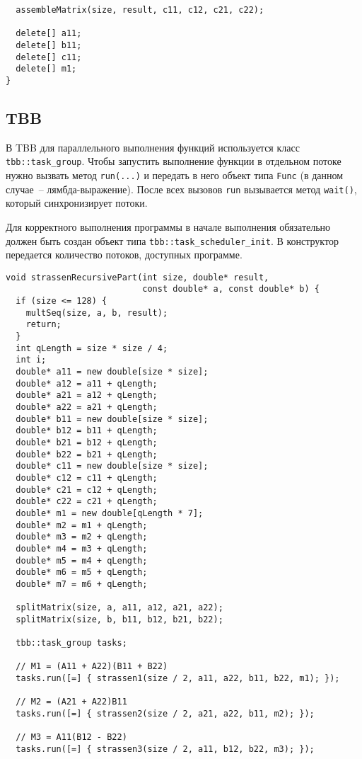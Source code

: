 \documentclass{report}
\begin{document}
\begin{center}
\begin{lstlisting}
  assembleMatrix(size, result, c11, c12, c21, c22);

  delete[] a11;
  delete[] b11;
  delete[] c11;
  delete[] m1;
}
\end{lstlisting}


\subsection{TBB}
В TBB для параллельного выполнения функций используется класс \lstinline{tbb::task_group}. Чтобы запустить выполнение функции в отдельном потоке нужно вызвать метод \lstinline{run(...)} и передать в него объект типа \lstinline{Func} (в данном случае~-- лямбда-выражение). После всех вызовов \lstinline{run} вызывается метод \lstinline{wait()}, который синхронизирует потоки.
\par Для корректного выполнения программы в начале выполнения обязательно должен быть создан объект типа \lstinline{tbb::task_scheduler_init}. В конструктор передается количество потоков, доступных программе.

\begin{lstlisting}
void strassenRecursivePart(int size, double* result,
                           const double* a, const double* b) {
  if (size <= 128) {
    multSeq(size, a, b, result);
    return;
  }
  int qLength = size * size / 4;
  int i;
  double* a11 = new double[size * size];
  double* a12 = a11 + qLength;
  double* a21 = a12 + qLength;
  double* a22 = a21 + qLength;
  double* b11 = new double[size * size];
  double* b12 = b11 + qLength;
  double* b21 = b12 + qLength;
  double* b22 = b21 + qLength;
  double* c11 = new double[size * size];
  double* c12 = c11 + qLength;
  double* c21 = c12 + qLength;
  double* c22 = c21 + qLength;
  double* m1 = new double[qLength * 7];
  double* m2 = m1 + qLength;
  double* m3 = m2 + qLength;
  double* m4 = m3 + qLength;
  double* m5 = m4 + qLength;
  double* m6 = m5 + qLength;
  double* m7 = m6 + qLength;

  splitMatrix(size, a, a11, a12, a21, a22);
  splitMatrix(size, b, b11, b12, b21, b22);

  tbb::task_group tasks;

  // M1 = (A11 + A22)(B11 + B22)
  tasks.run([=] { strassen1(size / 2, a11, a22, b11, b22, m1); });

  // M2 = (A21 + A22)B11
  tasks.run([=] { strassen2(size / 2, a21, a22, b11, m2); });

  // M3 = A11(B12 - B22)
  tasks.run([=] { strassen3(size / 2, a11, b12, b22, m3); });


\end{lstlisting}
\end{center}
\end{document}
